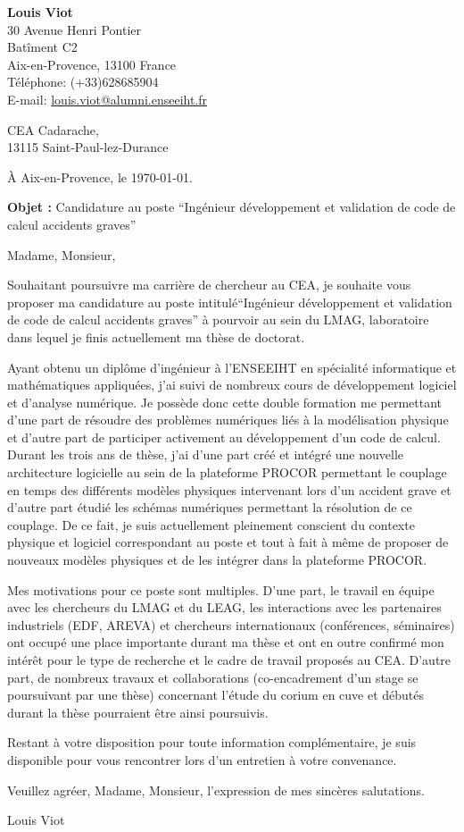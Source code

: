 \documentclass[11pt]{article}
\begin{document}
\begin{flushleft}
	\textbf{Louis Viot}\\
	30 Avenue Henri Pontier \\
	Batîment C2 \\
	Aix-en-Provence, 13100 France\\
	Téléphone: (+33)628685904 \\
	E-mail: \href{mailto:louis.viot@alumni.enseeiht.fr}{louis.viot@alumni.enseeiht.fr} \\
\end{flushleft}
\vspace{0.5 cm}
\begin{flushright}
	CEA Cadarache,\\
	13115 Saint-Paul-lez-Durance\\
\end{flushright}
\begin{flushright}
À Aix-en-Provence, le \today{}.
\end{flushright}
\textbf{Objet :} Candidature au poste ``Ingénieur développement et validation de code de calcul accidents graves''

Madame, Monsieur,

Souhaitant poursuivre ma carrière de chercheur au CEA, je souhaite vous proposer ma candidature au poste intitulé``Ingénieur développement et validation de code de calcul accidents graves'' à pourvoir au sein du LMAG, laboratoire dans lequel je finis actuellement ma thèse de doctorat.

Ayant obtenu un diplôme d'ingénieur à l'ENSEEIHT en spécialité informatique et mathématiques appliquées, j'ai suivi de nombreux cours de développement logiciel et d'analyse numérique. Je possède donc cette double formation me permettant d'une part de résoudre des problèmes numériques liés à la modélisation physique et d'autre part de participer activement au développement d'un code de calcul. Durant les trois ans de thèse, j'ai d'une part créé et intégré une nouvelle architecture logicielle au sein de la plateforme PROCOR permettant le couplage en temps des différents modèles physiques intervenant lors d'un accident grave et d'autre part étudié les schémas numériques permettant la résolution de ce couplage. De ce fait, je suis actuellement pleinement conscient du contexte physique et logiciel correspondant au poste et tout à fait à même de proposer de nouveaux modèles physiques et de les intégrer dans la plateforme PROCOR.

Mes motivations pour ce poste sont multiples. D'une part, le travail en équipe avec les chercheurs du LMAG et du LEAG, les interactions avec les partenaires industriels (EDF, AREVA) et chercheurs internationaux (conférences, séminaires) ont occupé une place importante durant ma thèse et ont en outre confirmé mon intérêt pour le type de recherche et le cadre de travail proposés au CEA. D'autre part, de nombreux travaux et collaborations (co-encadrement d'un stage se poursuivant par une thèse) concernant l'étude du corium en cuve et débutés durant la thèse pourraient être ainsi poursuivis.

Restant à votre disposition pour toute information complémentaire, je suis disponible pour vous rencontrer lors d’un entretien à votre convenance.

Veuillez agréer, Madame, Monsieur, l’expression de mes sincères salutations.

\begin{flushright}
Louis Viot
\end{flushright}
\end{document}
